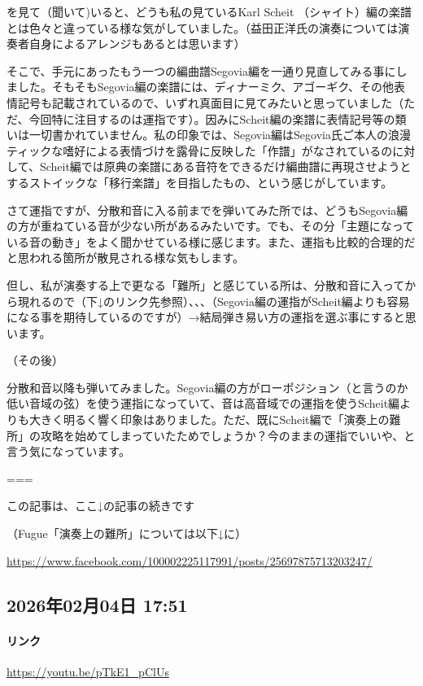\documentclass[facebook_diary.tex]{subfiles}
\begin{document}
を見て（聞いて)いると、どうも私の見ているKarl Scheit （シャイト）編の楽譜とは色々と違っている様な気がしていました。（益田正洋氏の演奏については演奏者自身によるアレンジもあるとは思います）


そこで、手元にあったもう一つの編曲譜Segovia編を一通り見直してみる事にしました。そもそもSegovia編の楽譜には、ディナーミク、アゴーギク、その他表情記号も記載されているので、いずれ真面目に見てみたいと思っていました（ただ、今回特に注目するのは運指です）。因みにScheit編の楽譜に表情記号等の類いは一切書かれていません。私の印象では、Segovia編はSegovia氏ご本人の浪漫ティックな嗜好による表情づけを露骨に反映した「作譜」がなされているのに対して、Scheit編では原典の楽譜にある音符をできるだけ編曲譜に再現させようとするストイックな「移行楽譜」を目指したもの、という感じがしています。


さて運指ですが、分散和音に入る前までを弾いてみた所では、どうもSegovia編の方が重ねている音が少ない所があるみたいです。でも、その分「主題になっている音の動き」をよく聞かせている様に感じます。また、運指も比較的合理的だと思われる箇所が散見される様な気もします。

但し、私が演奏する上で更なる「難所」と感じている所は、分散和音に入ってから現れるので（下↓のリンク先参照）、、、（Segovia編の運指がScheit編よりも容易になる事を期待しているのですが）→結局弾き易い方の運指を選ぶ事にすると思います。


（その後）

分散和音以降も弾いてみました。Segovia編の方がローポジション（と言うのか低い音域の弦）を使う運指になっていて、音は高音域での運指を使うScheit編よりも大きく明るく響く印象はありました。ただ、既にScheit編で「演奏上の難所」の攻略を始めてしまっていたためでしょうか？今のままの運指でいいや、と言う気になっています。


===

この記事は、ここ↓の記事の続きです

（Fugue「演奏上の難所」については以下↓に）

\url{https://www.facebook.com/100002225117991/posts/25697875713203247/}



\subsection*{2026年02月04日 17:51}

\paragraph{リンク}
\url{https://youtu.be/pTkE1_pClUs}
\end{document}
